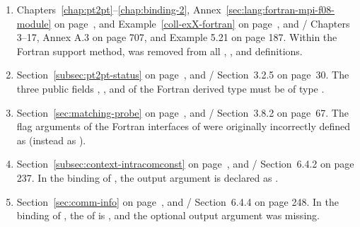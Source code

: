 \begin{enumerate}

\item 
Chapters~\ref{chap:pt2pt}--\ref{chap:binding-2},
Annex~\ref{sec:lang:fortran-mpi-f08-module} on page~\pageref{sec:lang:fortran-mpi-f08-module}, 
and Example~\ref{coll-exX-fortran} on page~\pageref{coll-exX-fortran}, and 
\MPIIIIDOTO/ Chapters 3--17, Annex A.3 on page 707, and Example 5.21 on page 187.
\newline 
Within the  Fortran support method,  was removed from 
all \flushline
{}, , and  definitions.

\item 
Section~\ref{subsec:pt2pt-status} on page~\pageref{subsec:pt2pt-status}, and
\MPIIIIDOTO/ Section~3.2.5 on page~30.
\newline 
The three public fields , , and  
of the Fortran derived type 
must be of type .

\item 
Section~\ref{sec:matching-probe} on page~\pageref{sec:matching-probe}, and
\MPIIIIDOTO/ Section~3.8.2 on page~67.
\newline 
The flag arguments of the Fortran interfaces of  
were originally incorrectly defined as  (instead as ). 

\item 
Section~\ref{subsec:context-intracomconst} on page~\pageref{subsec:context-intracomconst}, and
\MPIIIIDOTO/ Section~6.4.2 on page 237.
\newline 
In the  binding of ,
the output argument  is declared as .

\item 
Section~\ref{sec:comm-info} on page~\pageref{sec:comm-info}, and
\MPIIIIDOTO/ Section~6.4.4 on page 248.
\newline 
In the  binding of ,
the  of  is , and
the optional output argument  was missing.


\end{enumerate}
